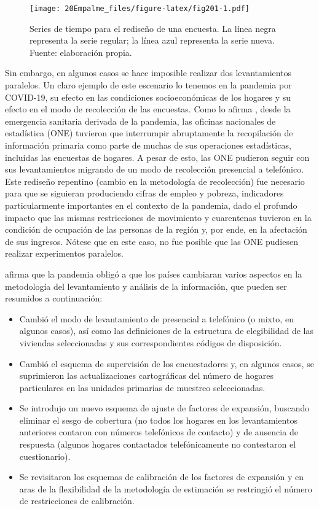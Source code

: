 \documentclass[
  12pt,
]{book}
\providecommand{\tightlist}{%
  \setlength{\itemsep}{0pt}\setlength{\parskip}{0pt}}
\begin{document}
\begin{figure}
\centering
\texttt{[image: 20Empalme\_files/figure-latex/fig201-1.pdf]}
\caption{\label{fig:fig201}Series de tiempo para el rediseño de una encuesta. La línea negra representa la serie regular; la línea azul representa la serie nueva. Fuente: elaboración propia.}
\end{figure}

Sin embargo, en algunos casos se hace imposible realizar dos levantamientos paralelos. Un claro ejemplo de este escenario lo tenemos en la pandemia por COVID-19, su efecto en las condiciones socioeconómicas de los hogares y su efecto en el modo de recolección de las encuestas. Como lo afirma \citet{CEPAL_continua}, desde la emergencia sanitaria derivada de la pandemia, las oficinas nacionales de estadística (ONE) tuvieron que interrumpir abruptamente la recopilación de información primaria como parte de muchas de sus operaciones estadísticas, incluidas las encuestas de hogares. A pesar de esto, las ONE pudieron seguir con sus levantamientos migrando de un modo de recolección presencial a telefónico.
Este rediseño repentino (cambio en la metodología de recolección) fue necesario para que se siguieran produciendo cifras de empleo y pobreza, indicadores particularmente importantes en el contexto de la pandemia, dado el profundo impacto que las mismas restricciones de movimiento y cuarentenas tuvieron en la condición de ocupación de las personas de la región y, por ende, en la afectación de sus ingresos. Nótese que en este caso, no fue posible que las ONE pudiesen realizar experimentos paralelos.

\citet{CEPAL_continua} afirma que la pandemia obligó a que los países cambiaran varios aspectos en la metodología del levantamiento y análisis de la información, que pueden ser resumidos a continuación:

\begin{itemize}
\tightlist
\item
  Cambió el modo de levantamiento de presencial a telefónico (o mixto, en algunos casos), así como las definiciones de la estructura de elegibilidad de las viviendas seleccionadas y sus correspondientes códigos de disposición.
\item
  Cambió el esquema de supervisión de los encuestadores y, en algunos casos, se suprimieron las actualizaciones cartográficas del número de hogares particulares en las unidades primarias de muestreo seleccionadas.
\item
  Se introdujo un nuevo esquema de ajuste de factores de expansión, buscando eliminar el sesgo de cobertura (no todos los hogares en los levantamientos anteriores contaron con números telefónicos de contacto) y de ausencia de respuesta (algunos hogares contactados telefónicamente no contestaron el cuestionario).
\item
  Se revisitaron los esquemas de calibración de los factores de expansión y en aras de la flexibilidad de la metodología de estimación se restringió el número de restricciones de calibración.
\end{itemize}
\end{document}
